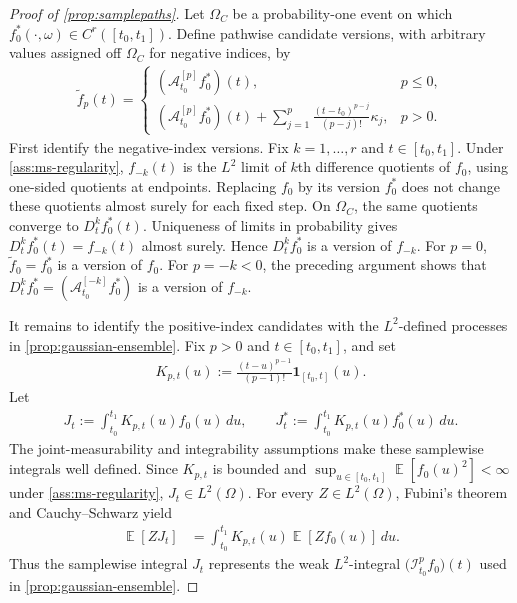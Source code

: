 \documentclass[11pt,a4paper]{article}
\theoremstyle{definition}
\theoremstyle{remark}
\DeclareMathOperator{\E}{\mathbb{E}}
\begin{document}
\begin{proof}[Proof of \cref{prop:samplepaths}]
Let \(\Omega_C\) be a probability-one event on which \(f_0^\ast(\cdot,\omega)\in C^r([t_0,t_1])\). Define pathwise candidate versions, with arbitrary values assigned off \(\Omega_C\) for negative indices, by
\begin{align*}
\tilde f_p(t)=
\begin{cases}
(\mathcal A_{t_0}^{[p]}f_0^\ast)(t), & p\le 0,\\
(\mathcal A_{t_0}^{[p]}f_0^\ast)(t)+\displaystyle\sum_{j=1}^{p}\frac{(t-t_0)^{p-j}}{(p-j)!}\kappa_j, & p>0.
\end{cases}
\end{align*}
First identify the negative-index versions. Fix \(k=1,\ldots,r\) and \(t\in[t_0,t_1]\). Under \cref{ass:ms-regularity}, \(f_{-k}(t)\) is the \(L^2\) limit of \(k\)th difference quotients of \(f_0\), using one-sided quotients at endpoints. Replacing \(f_0\) by its version \(f_0^\ast\) does not change these quotients almost surely for each fixed step. On \(\Omega_C\), the same quotients converge to \(D_t^k f_0^\ast(t)\). Uniqueness of limits in probability gives \(D_t^k f_0^\ast(t)=f_{-k}(t)\) almost surely. Hence \(D_t^k f_0^\ast\) is a version of \(f_{-k}\). For \(p=0\), \(\tilde f_0=f_0^\ast\) is a version of \(f_0\). For \(p=-k<0\), the preceding argument shows that \(D_t^k f_0^\ast=(\mathcal A_{t_0}^{[-k]}f_0^\ast)\) is a version of \(f_{-k}\).

It remains to identify the positive-index candidates with the \(L^2\)-defined processes in \cref{prop:gaussian-ensemble}. Fix \(p>0\) and \(t\in[t_0,t_1]\), and set
\begin{align*}
K_{p,t}(u):=\frac{(t-u)^{p-1}}{(p-1)!}\mathbf 1_{[t_0,t]}(u).
\end{align*}
Let
\begin{align*}
J_t:=\int_{t_0}^{t_1}K_{p,t}(u)f_0(u)\,du,
\qquad
J_t^\ast:=\int_{t_0}^{t_1}K_{p,t}(u)f_0^\ast(u)\,du.
\end{align*}
The joint-measurability and integrability assumptions make these samplewise integrals well defined. Since \(K_{p,t}\) is bounded and \(\sup_{u\in[t_0,t_1]}\E[f_0(u)^2]<\infty\) under \cref{ass:ms-regularity}, \(J_t\in L^2(\Omega)\). For every \(Z\in L^2(\Omega)\), Fubini's theorem and Cauchy--Schwarz yield
\begin{align*}
\E[ZJ_t]
&=\int_{t_0}^{t_1}K_{p,t}(u)\E[Zf_0(u)]\,du.
\end{align*}
Thus the samplewise integral \(J_t\) represents the weak \(L^2\)-integral \(\bigl(\mathcal I_{t_0}^{p}f_0\bigr)(t)\) used in \cref{prop:gaussian-ensemble}.


\end{proof}
\end{document}
